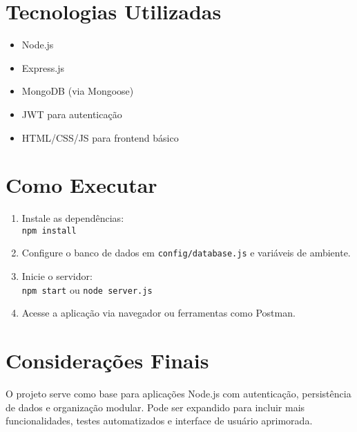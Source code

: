 \documentclass[12pt,a4paper]{article}
\begin{document}
\section{Tecnologias Utilizadas}
\begin{itemize}
  \item Node.js
  \item Express.js
  \item MongoDB (via Mongoose)
  \item JWT para autenticação
  \item HTML/CSS/JS para frontend básico
\end{itemize}

\section{Como Executar}
\begin{enumerate}
  \item Instale as dependências: \\ \texttt{npm install}
  \item Configure o banco de dados em \texttt{config/database.js} e variáveis de ambiente.
  \item Inicie o servidor: \\ \texttt{npm start} ou \texttt{node server.js}
  \item Acesse a aplicação via navegador ou ferramentas como Postman.
\end{enumerate}

\section{Considerações Finais}
O projeto serve como base para aplicações Node.js com autenticação, persistência de dados e organização modular. Pode ser expandido para incluir mais funcionalidades, testes automatizados e interface de usuário aprimorada.
\end{document}
